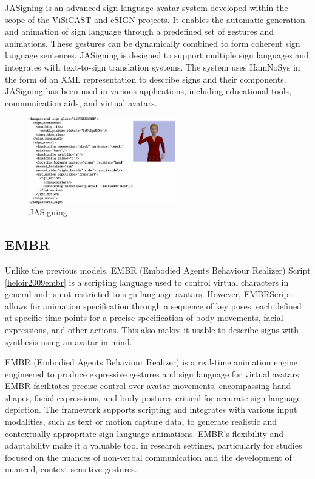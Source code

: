 \documentclass[../../main.tex]{subfiles}
\begin{document}
JASigning is an advanced sign language avatar system developed within the scope of the ViSiCAST and eSIGN projects\cite{elliott2010towards}. It enables the automatic generation and animation of sign language through a predefined set of gestures and animations. These gestures can be dynamically combined to form coherent sign language sentences. JASigning is designed to support multiple sign languages and integrates with text-to-sign translation systems. The system uses HamNoSys in the form of an XML representation\cite{elliott2004overview} to describe signs and their components. JASigning has been used in various applications, including educational tools, communication aids, and virtual avatars.

\begin{figure}
  \centering \includegraphics[width = 2.5in]{chapters/background_work/images/jasigning.png}
  \caption{JASigning}
  \label{fig:jasigning}
\end{figure}

\subsection{EMBR}

Unlike the previous models, EMBR (Embodied Agents Behaviour Realizer) Script \ref{heloir2009embr} is a scripting language used to control virtual characters in general and is not restricted to sign language avatars. However, EMBRScript allows for animation specification through a sequence of key poses, each defined at specific time points for a precise specification of body movements, facial expressions, and other actions. This also makes it usable to describe signs with synthesis using an avatar in mind.

EMBR (Embodied Agents Behaviour Realizer)\cite{heloir2010real} is a real-time animation engine engineered to produce expressive gestures and sign language for virtual avatars. EMBR facilitates precise control over avatar movements, encompassing hand shapes, facial expressions, and body postures critical for accurate sign language depiction. The framework supports scripting and integrates with various input modalities, such as text or motion capture data, to generate realistic and contextually appropriate sign language animations. EMBR's flexibility and adaptability make it a valuable tool in research settings, particularly for studies focused on the nuances of non-verbal communication and the development of nuanced, context-sensitive gestures.
\end{document}
